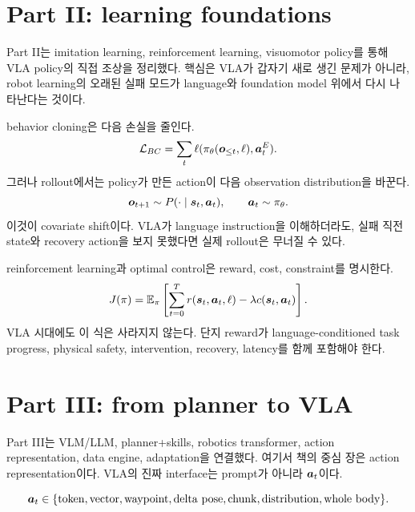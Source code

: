 \section{Part II: learning foundations}

Part II는 imitation learning, reinforcement learning, visuomotor policy를 통해 VLA policy의 직접 조상을 정리했다. 핵심은 VLA가 갑자기 새로 생긴 문제가 아니라, robot learning의 오래된 실패 모드가 language와 foundation model 위에서 다시 나타난다는 것이다.

behavior cloning은 다음 손실을 줄인다.
\begin{equation}
  \mathcal{L}_{BC}
  =
  \sum_{t}
  \ell(
  \pi_{\theta}(\bm{o}_{\leq t},\ell),
  \bm{a}_t^{E}
  ).
  \label{eq:ch21-bc-review}
\end{equation}
그러나 rollout에서는 policy가 만든 action이 다음 observation distribution을 바꾼다.
\begin{equation}
  \bm{o}_{t+1}
  \sim
  P(\cdot \mid \bm{s}_t,\bm{a}_t),
  \qquad
  \bm{a}_t \sim \pi_{\theta}.
  \label{eq:ch21-rollout-shift}
\end{equation}
이것이 covariate shift이다. VLA가 language instruction을 이해하더라도, 실패 직전 state와 recovery action을 보지 못했다면 실제 rollout은 무너질 수 있다.

reinforcement learning과 optimal control은 reward, cost, constraint를 명시한다.
\begin{equation}
  J(\pi)
  =
  \mathbb{E}_{\pi}
  \left[
  \sum_{t=0}^{T}
  r(\bm{s}_t,\bm{a}_t,\ell)
  -
  \lambda c(\bm{s}_t,\bm{a}_t)
  \right].
  \label{eq:ch21-rl-review}
\end{equation}
VLA 시대에도 이 식은 사라지지 않는다. 단지 reward가 language-conditioned task progress, physical safety, intervention, recovery, latency를 함께 포함해야 한다.

\section{Part III: from planner to VLA}

Part III는 VLM/LLM, planner+skills, robotics transformer, action representation, data engine, adaptation을 연결했다. 여기서 책의 중심 장은 action representation이다. VLA의 진짜 interface는 prompt가 아니라 $\bm{a}_t$이다.

\begin{equation}
  \bm{a}_t
  \in
  \{
  \mathrm{token},
  \mathrm{vector},
  \mathrm{waypoint},
  \mathrm{delta\ pose},
  \mathrm{chunk},
  \mathrm{distribution},
  \mathrm{whole\ body}
  \}.
  \label{eq:ch21-action-spectrum}
\end{equation}

